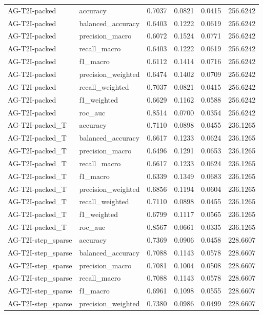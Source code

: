 \begin{tabular}{llrrrr}
AG-T2I-packed & accuracy & 0.7037 & 0.0821 & 0.0415 & 256.6242 \\
AG-T2I-packed & balanced_accuracy & 0.6403 & 0.1222 & 0.0619 & 256.6242 \\
AG-T2I-packed & precision_macro & 0.6072 & 0.1524 & 0.0771 & 256.6242 \\
AG-T2I-packed & recall_macro & 0.6403 & 0.1222 & 0.0619 & 256.6242 \\
AG-T2I-packed & f1_macro & 0.6112 & 0.1414 & 0.0716 & 256.6242 \\
AG-T2I-packed & precision_weighted & 0.6474 & 0.1402 & 0.0709 & 256.6242 \\
AG-T2I-packed & recall_weighted & 0.7037 & 0.0821 & 0.0415 & 256.6242 \\
AG-T2I-packed & f1_weighted & 0.6629 & 0.1162 & 0.0588 & 256.6242 \\
AG-T2I-packed & roc_auc & 0.8514 & 0.0700 & 0.0354 & 256.6242 \\
AG-T2I-packed_T & accuracy & 0.7110 & 0.0898 & 0.0455 & 236.1265 \\
AG-T2I-packed_T & balanced_accuracy & 0.6617 & 0.1233 & 0.0624 & 236.1265 \\
AG-T2I-packed_T & precision_macro & 0.6496 & 0.1291 & 0.0653 & 236.1265 \\
AG-T2I-packed_T & recall_macro & 0.6617 & 0.1233 & 0.0624 & 236.1265 \\
AG-T2I-packed_T & f1_macro & 0.6339 & 0.1349 & 0.0683 & 236.1265 \\
AG-T2I-packed_T & precision_weighted & 0.6856 & 0.1194 & 0.0604 & 236.1265 \\
AG-T2I-packed_T & recall_weighted & 0.7110 & 0.0898 & 0.0455 & 236.1265 \\
AG-T2I-packed_T & f1_weighted & 0.6799 & 0.1117 & 0.0565 & 236.1265 \\
AG-T2I-packed_T & roc_auc & 0.8567 & 0.0661 & 0.0335 & 236.1265 \\
AG-T2I-step_sparse & accuracy & 0.7369 & 0.0906 & 0.0458 & 228.6607 \\
AG-T2I-step_sparse & balanced_accuracy & 0.7088 & 0.1143 & 0.0578 & 228.6607 \\
AG-T2I-step_sparse & precision_macro & 0.7081 & 0.1004 & 0.0508 & 228.6607 \\
AG-T2I-step_sparse & recall_macro & 0.7088 & 0.1143 & 0.0578 & 228.6607 \\
AG-T2I-step_sparse & f1_macro & 0.6961 & 0.1098 & 0.0555 & 228.6607 \\
AG-T2I-step_sparse & precision_weighted & 0.7380 & 0.0986 & 0.0499 & 228.6607 \\

\end{tabular}

